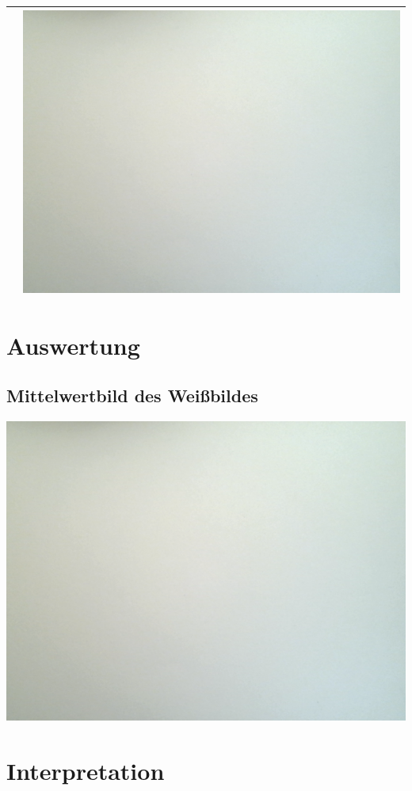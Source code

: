 \begin{tabular}{|c|c|}
 & 
\includegraphics[scale=0.27]{weissbilder/weissbild_9.png}
 \\ 
\hline 
\end{tabular} 

\section{Auswertung}
\label{chap:VERSUCH_3_AUSWERTUNG}

\subsection{Mittelwertbild des Weißbildes}
\includegraphics[scale=0.5]{weissbilder/weissbild_9.png}

\section{Interpretation}
\label{chap:VERSUCH_3_INTERPRETATION}
